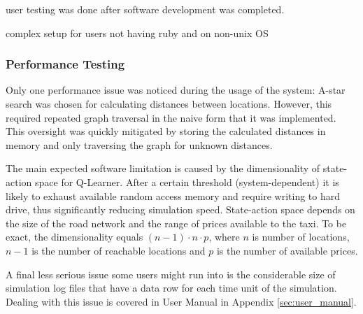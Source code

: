 user testing was done after software development
was completed. 

complex setup for users not having ruby and on non-unix OS

\subsubsection{Performance Testing}

Only one performance issue was noticed during the usage of the system: A-star
search was chosen for calculating distances between locations. However, this
required repeated graph traversal in the naive form that it was implemented.
This oversight was quickly mitigated by storing the calculated distances in
memory and only traversing the graph for unknown distances.

The main expected software limitation is caused by the dimensionality of state-
action space for Q-Learner. After a certain threshold (system-dependent) it is
likely to exhaust available random access memory and require writing to hard
drive, thus significantly reducing simulation speed. State-action space depends
on the size of the road network and the range of prices available to the taxi.
To be exact, the dimensionality equals \( (n-1) \cdot n \cdot p\), where \(n\)
is number of locations, \(n-1\) is the number of reachable locations and \(p\)
is the number of available prices.

A final less serious issue some users might run into is the considerable
size of simulation log files that have a data row for each time unit of the
simulation. Dealing with this issue is covered in User Manual in Appendix \ref{sec:user_manual}.
